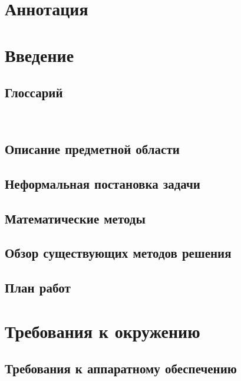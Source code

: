 \documentclass{fefu}
\author{Сластен Т.Д.}
\begin{document}
  \makereporttitle

  \tableofcontents
  \pagebreak

  \section*{Аннотация}
  
  \pagebreak

  \section{Введение}
  \subsection{Глоссарий}
  \
  \subsection{Описание предметной области}
  
  \subsection{Неформальная постановка задачи}
  
  \subsection{Математические методы}
  
  \subsection{Обзор существующих методов решения}
  
  \subsection{План работ}
  

  \section{Требования к окружению}
  \subsection{Требования к аппаратному обеспечению}
  
\end{document}
